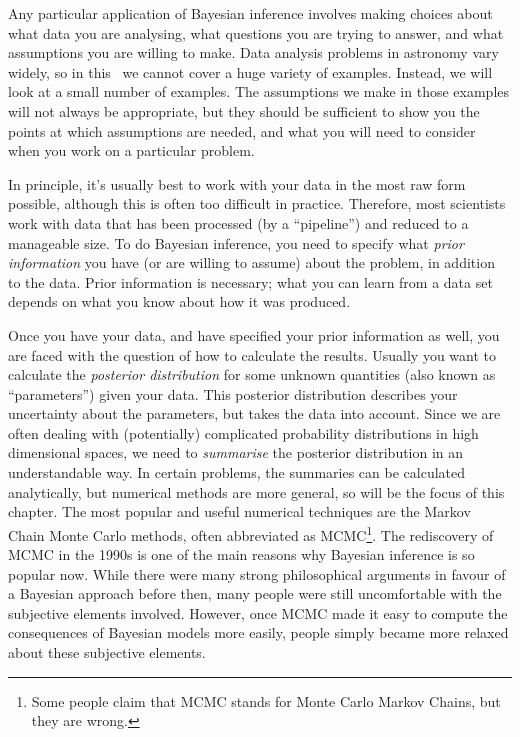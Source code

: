 Any particular application of Bayesian inference involves making choices
about what data you are analysing, what questions you are
trying to answer, and what assumptions you are willing to make.
Data analysis problems in astronomy vary widely, so in this \documentname~we
cannot cover a huge variety of examples. Instead, we will look at a small
number of examples. The assumptions we make in those examples will not always
be appropriate, but they should be sufficient to show you the points at which
assumptions are needed, and what you will need to consider when you work on a particular problem.

In principle, it's usually best to work with your data in the most
raw form possible, although this is often too difficult in practice.
Therefore, most scientists work with data that has been processed (by a ``pipeline'') and reduced to a manageable size. To do Bayesian inference, you
need to specify what {\it prior information} you have (or are willing to
assume) about the problem, in addition to the data. Prior information is
necessary; what you can learn from a data set depends on what you know
about how it was produced.

Once you have your data, and have specified your prior information as well,
you are faced with the question of how to calculate the
results. Usually you want to calculate the {\it posterior distribution} for some
unknown quantities (also known as ``parameters'') given your data. This
posterior distribution
describes your uncertainty about the parameters, but takes the data into account.
Since we are often dealing with (potentially) complicated probability
distributions in high dimensional spaces, we need to {\it summarise} the
posterior distribution in an understandable way.
In certain problems, the summaries can be calculated analytically, but
numerical methods are more general, so will be the focus of this chapter.
The most popular and useful numerical techniques are the Markov Chain Monte
Carlo methods, often abbreviated as
MCMC\footnote{Some people claim that MCMC stands for
Monte Carlo Markov Chains, but they are wrong.}.
The rediscovery of MCMC in the 1990s
is one of the main reasons why Bayesian inference is so popular now.
While there were many strong philosophical arguments in favour of a Bayesian
approach before then, many people were still uncomfortable with the
subjective elements involved. However, once MCMC made it easy to compute the
consequences of Bayesian models more easily, people simply became more relaxed
about these subjective elements.

